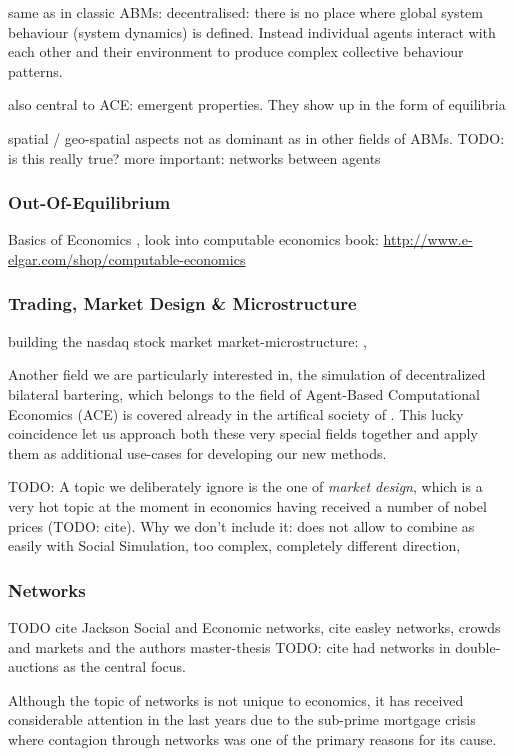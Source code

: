same as in classic ABMs: decentralised: there is no place where global system behaviour (system dynamics) is defined. Instead individual agents interact with each other and their environment to produce complex collective behaviour patterns.

also central to ACE: emergent properties. They show up in the form of equilibria

spatial / geo-spatial aspects not as dominant as in other fields of ABMs. TODO: is this really true?
more important: networks between agents


\subsubsection{Out-Of-Equilibrium}
Basics of Economics \cite{bowles_understanding_2005}, \cite{kirman_complex_2010}
look into computable economics book: \url{http://www.e-elgar.com/shop/computable-economics}

\subsubsection{Trading, Market Design \& Microstructure}
building the nasdaq stock market
market-microstructure: \cite{LehalleLaruelle2013}, \cite{baker_market_2013}

Another field we are particularly interested in, the simulation of decentralized bilateral bartering, which belongs to the field of Agent-Based Computational Economics (ACE) \cite{tesfatsion_agent-based_2006} is covered already in the artifical society of \cite{epstein_growing_1996}. This lucky coincidence let us approach both these very special fields together and apply them as additional use-cases for developing our new methods.

TODO: A topic we deliberately ignore is the one of \textit{market design}, which is a very hot topic at the moment in economics having received a number of nobel prices (TODO: cite). Why we don't include it: does not allow to combine as easily with Social Simulation, too complex, completely different direction, 

\subsubsection{Networks}
TODO cite Jackson Social and Economic networks, cite easley networks, crowds and markets
and the authors master-thesis TODO: cite had networks in double-auctions as the central focus. 

Although the topic of networks is not unique to economics, it has received considerable attention in the last years due to the sub-prime mortgage crisis where contagion through networks was one of the primary reasons for its cause. \\

